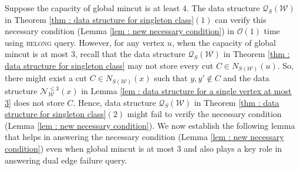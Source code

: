 \documentclass[letterpaper,11pt]{article}
\begin{document}
Suppose the capacity of global mincut is at least $4$.
The data structure ${\mathcal Q}_S({\mathcal W})$ in Theorem \ref{thm : data structure for singleton class}$(1)$ can verify this necessary condition (Lemma \ref{lem : new necessary condition}) in ${\mathcal O}(1)$ time using \textsc{belong} query.
However, for any vertex $u$, when the capacity of global mincut is at most $3$, recall that the data structure ${\mathcal Q}_S({\mathcal W})$ in Theorem \ref{thm : data structure for singleton class} may not store every cut $C\in N_{S({\mathcal W})}(u)$. So, there might exist a cut $C\in N_{S({\mathcal W})}(x)$ such that $y,y'\notin C$ and the data structure ${\mathcal N}_{\mathcal W}^{\le 3}(x)$ in Lemma \ref{lem : data structure for a single vertex at most 3} does not store $C$. Hence, data structure ${\mathcal Q}_S({\mathcal W})$ in Theorem \ref{thm : data structure for singleton class}$(2)$ might fail to verify the necessary condition (Lemma \ref{lem : new necessary condition}). We now establish the following lemma that helps in answering the necessary condition (Lemma \ref{lem : new necessary condition}) even when global mincut is at most $3$ and also plays a key role in answering dual edge failure query. 
\end{document}
